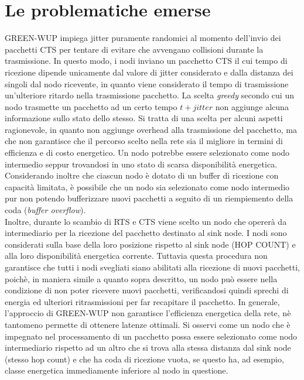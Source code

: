 \documentclass{report}
\begin{document}
\section{Le problematiche emerse}

GREEN-WUP impiega jitter puramente randomici al momento dell'invio dei pacchetti CTS per tentare di evitare che avvengano collisioni durante
la trasmissione. In questo modo, i nodi inviano un pacchetto CTS il cui tempo di ricezione dipende unicamente dal valore di jitter
considerato e dalla distanza dei singoli dal nodo ricevente, in quanto viene considerato il tempo di trasmissione un'ulteriore ritardo nella
trasmissione pacchetto. La scelta \emph{greedy} secondo cui un nodo trasmette un pacchetto ad un certo tempo $t+jitter$ non aggiunge alcuna
informazione sullo stato dello stesso. Si tratta di una scelta per alcuni aspetti ragionevole, in quanto non aggiunge overhead alla trasmissione
del pacchetto, ma che non garantisce che il percorso scelto nella rete sia il migliore in termini di efficienza e di costo energetico. Un nodo
potrebbe essere selezionato come nodo intermedio seppur trovandosi in uno stato di scarsa disponibilità energetica. Considerando inoltre che
ciascun nodo è dotato di un buffer di ricezione con capacità limitata, è possibile che un nodo sia selezionato come nodo intermedio pur non
potendo bufferizzare nuovi pacchetti a seguito di un riempiemento della coda (\emph{buffer overflow}).\\

Inoltre, durante lo scambio di RTS e CTS viene scelto un nodo che opererà da intermediario per la ricezione del pacchetto destinato
al sink node. I nodi sono considerati sulla base della loro posizione rispetto al sink node (HOP COUNT) e alla loro disponibilità energetica corrente.
Tuttavia questa procedura non garantisce che tutti i nodi svegliati siano abilitati alla ricezione di nuovi pacchetti, poichè, in maniera simile a
quanto sopra descritto, un nodo può essere nella condizione di non poter ricevere nuovi pacchetti, verificandosi quindi sprechi di energia ed
ulteriori ritrasmissioni per far recapitare il pacchetto. In generale, l'approccio di GREEN-WUP non garantisce l'efficienza energetica della rete,
nè tantomeno permette di ottenere latenze ottimali. Si osservi come un nodo che è impegnato nel processamento di un pacchetto possa essere selezionato
come nodo intermediario rispetto ad un altro che si trova alla stessa distanza dal sink node (stesso hop count) e che ha coda di ricezione vuota, se questo
ha, ad esempio, classe energetica immediamente inferiore al nodo in questione. \\
\end{document}
